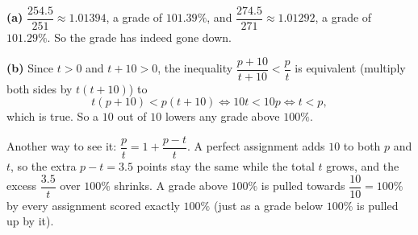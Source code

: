 \textbf{(a)} $\dfrac{254.5}{251}\approx1.01394$, a grade of $101.39\%$, and $\dfrac{274.5}{271}\approx1.01292$, a grade of $101.29\%$. So the grade has indeed gone down.

\textbf{(b)} Since $t>0$ and $t+10>0$, the inequality $\dfrac{p+10}{t+10}<\dfrac pt$ is equivalent (multiply both sides by $t(t+10)$) to
\[t(p+10)<p(t+10)\iff10t<10p\iff t<p,\]
which is true. So a $10$ out of $10$ lowers any grade above $100\%$.

Another way to see it: $\dfrac pt=1+\dfrac{p-t}{t}$. A perfect assignment adds $10$ to both $p$ and $t$, so the extra $p-t=3.5$ points stay the same while the total $t$ grows, and the excess $\dfrac{3.5}{t}$ over $100\%$ shrinks. A grade above $100\%$ is pulled towards $\dfrac{10}{10}=100\%$ by every assignment scored exactly $100\%$ (just as a grade below $100\%$ is pulled up by it).
